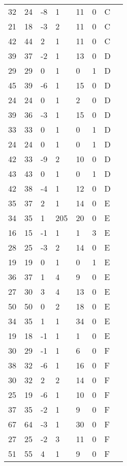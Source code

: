 \begin{longtable}{ p{2cm} p{2cm} p{2cm} p{2cm} p{2cm} p{2cm} p{2cm} p{2cm}}
 32 &  24 &  -8 &   1 &  11 &   0 &   C \\ 
 21 &  18 &  -3 &   2 &  11 &   0 &   C \\ 
 42 &  44 &   2 &   1 &  11 &   0 &   C \\ 
 39 &  37 &  -2 &   1 &  13 &   0 &   D \\ 
 29 &  29 &   0 &   1 &   0 &   1 &   D \\ 
 45 &  39 &  -6 &   1 &  15 &   0 &   D \\ 
 24 &  24 &   0 &   1 &   2 &   0 &   D \\ 
 39 &  36 &  -3 &   1 &  15 &   0 &   D \\ 
 33 &  33 &   0 &   1 &   0 &   1 &   D \\ 
 24 &  24 &   0 &   1 &   0 &   1 &   D \\ 
 42 &  33 &  -9 &   2 &  10 &   0 &   D \\ 
 43 &  43 &   0 &   1 &   0 &   1 &   D \\ 
 42 &  38 &  -4 &   1 &  12 &   0 &   D \\ 
 35 &  37 &   2 &   1 &  14 &   0 &   E \\ 
 34 &  35 &   1 & 205 &  20 &   0 &   E \\ 
 16 &  15 &  -1 &   1 &   1 &   3 &   E \\ 
 28 &  25 &  -3 &   2 &  14 &   0 &   E \\ 
 19 &  19 &   0 &   1 &   0 &   1 &   E \\ 
 36 &  37 &   1 &   4 &   9 &   0 &   E \\ 
 27 &  30 &   3 &   4 &  13 &   0 &   E \\ 
 50 &  50 &   0 &   2 &  18 &   0 &   E \\ 
 34 &  35 &   1 &   1 &  34 &   0 &   E \\ 
 19 &  18 &  -1 &   1 &   1 &   0 &   E \\ 
 30 &  29 &  -1 &   1 &   6 &   0 &   F \\ 
 38 &  32 &  -6 &   1 &  16 &   0 &   F \\ 
 30 &  32 &   2 &   2 &  14 &   0 &   F \\ 
 25 &  19 &  -6 &   1 &  10 &   0 &   F \\ 
 37 &  35 &  -2 &   1 &   9 &   0 &   F \\ 
 67 &  64 &  -3 &   1 &  30 &   0 &   F \\ 
 27 &  25 &  -2 &   3 &  11 &   0 &   F \\ 
 51 &  55 &   4 &   1 &   9 &   0 &   F \\ 

\end{longtable}
